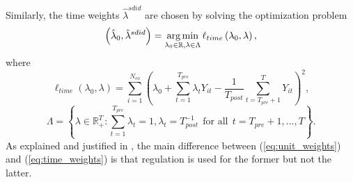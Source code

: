 \documentclass[../Main.tex]{subfiles}
\begin{document}
Similarly, the time weights $\hat{\lambda}^{sdid}$ are chosen by solving the optimization problem
\begin{equation} \label{eq:time_weights}
    \left(\hat{\lambda}_0,\hat{\lambda}^{sdid}\right)=\operatorname*{arg\,min}_{\lambda_0\in\mathbb{R},\lambda\in\Lambda}\ell_{time}\left(\lambda_0,\lambda\right),
\end{equation}
where
\begin{equation*}
    \ell_{time}\left(\lambda_0,\lambda\right)=\sum_{i=1}^{N_{co}}\left(\lambda_0+\sum_{t=1}^{T_{pre}}\lambda_tY_{it}-\frac{1}{T_{post}}\sum_{t=T_{pre}+1}^TY_{it}\right)^2,
\end{equation*}
\begin{equation*}
    \Lambda=\left\{\lambda\in\mathbb{R}_+^T:\sum_{t=1}^{T_{pre}}\lambda_t=1,\lambda_t=T_{post}^{-1} ~~ \text{for all} ~~ t=T_{pre}+1,\dots ,T \right\}.
\end{equation*}
As explained and justified in \citet{arkhangelsky2021synthetic}, the main difference between (\ref{eq:unit_weights}) and (\ref{eq:time_weights}) is that regulation is used for the former but not the latter.
\end{document}
